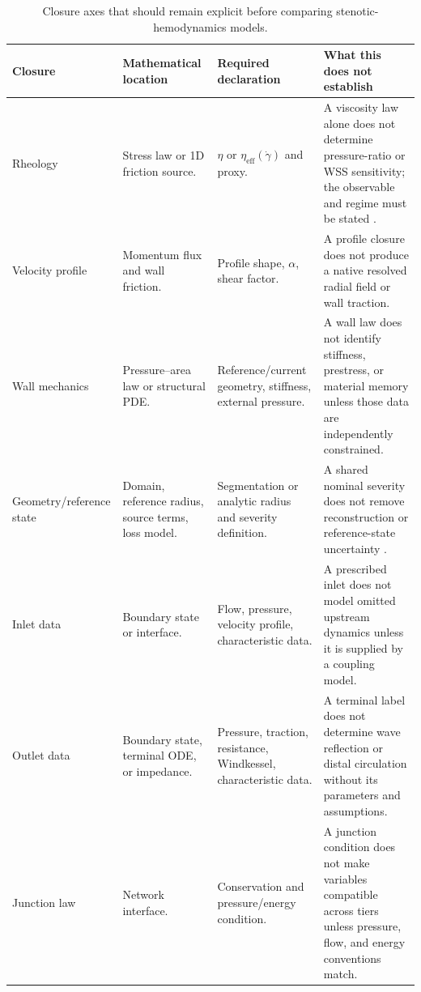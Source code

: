 \begin{table}[!htb]
    \centering
    \scriptsize
    \caption{Closure axes that should remain explicit before comparing
    stenotic-hemodynamics models.}
    \label{tab:modeling-closures-observables}
    \begin{tabularx}{\textwidth}{@{}
        >{\raggedright\arraybackslash}p{}
        >{\raggedright\arraybackslash}p{}
        >{\raggedright\arraybackslash}p{}
        >{\raggedright\arraybackslash}X@{}}
        \toprule
        \textbf{Closure}
            & \textbf{Mathematical location}
            & \textbf{Required declaration}
            & \textbf{What this does not establish} \\
        \midrule
        Rheology
            & Stress law or 1D friction source.
            & $\eta$ or $\eta_{\mathrm{eff}}(\dot\gamma)$ and proxy.
            & A viscosity law alone does not determine pressure-ratio or WSS
            sensitivity; the observable and regime must be stated
            \cite{LiuEtAl2021ICASRheology}. \\
        Velocity profile
            & Momentum flux and wall friction.
            & Profile shape, $\alpha$, shear factor.
            & A profile closure does not produce a native resolved radial field
            or wall traction. \\
        Wall mechanics
            & Pressure--area law or structural PDE.
            & Reference/current geometry, stiffness, external pressure.
            & A wall law does not identify stiffness, prestress, or material
            memory unless those data are independently constrained. \\
        Geometry/reference state
            & Domain, reference radius, source terms, loss model.
            & Segmentation or analytic radius and severity definition.
            & A shared nominal severity does not remove reconstruction or
            reference-state uncertainty
            \cite{GambarutoEtAl2011GeometryRheologySensitivity}. \\
        Inlet data
            & Boundary state or interface.
            & Flow, pressure, velocity profile, characteristic data.
            & A prescribed inlet does not model omitted upstream dynamics unless
            it is supplied by a coupling model. \\
        Outlet data
            & Boundary state, terminal ODE, or impedance.
            & Pressure, traction, resistance, Windkessel, characteristic data.
            & A terminal label does not determine wave reflection or distal
            circulation without its parameters and assumptions. \\
        Junction law
            & Network interface.
            & Conservation and pressure/energy condition.
            & A junction condition does not make variables compatible across
            tiers unless pressure, flow, and energy conventions match. \\
        \bottomrule
    \end{tabularx}
\end{table}

